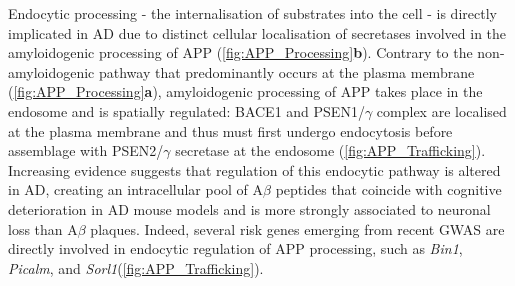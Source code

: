 \newpage
{} 
Endocytic processing - the internalisation of substrates into the cell - is directly implicated in AD due to distinct cellular localisation of secretases involved in the amyloidogenic processing of APP\cite{Acker2019} (\cref{fig:APP_Processing}\textbf{b}). Contrary to the non-amyloidogenic pathway that predominantly occurs at the plasma membrane\cite{Sisodia1992} (\cref{fig:APP_Processing}\textbf{a}), amyloidogenic processing of APP takes place in the endosome and is spatially regulated: BACE1 and PSEN1/$\gamma$ complex are localised at the plasma membrane and thus must first undergo endocytosis before assemblage with PSEN2/$\gamma$ secretase at the endosome (\cref{fig:APP_Trafficking}). Increasing evidence suggests that regulation of this endocytic pathway is altered in AD, creating an intracellular pool of A$\beta$ peptides \cite{Peric2015} that coincide with cognitive deterioration in AD mouse models \cite{Tomiyama2010,Knobloch2007,Billings2005} and is more strongly associated to neuronal loss than A$\beta$ plaques\cite{Christensen2008}. Indeed, several risk genes emerging from recent GWAS are directly involved in endocytic regulation of APP processing, such as \textit{Bin1}, \textit{Picalm}, and \textit{Sorl1}\cite{Schmidt2016,Dumanis2015}(\cref{fig:APP_Trafficking}).   

